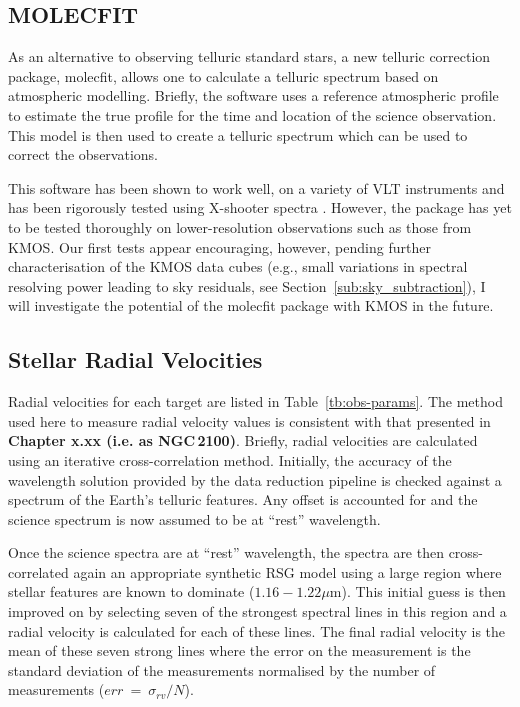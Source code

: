 
\subsection{MOLECFIT} %
\label{sub:molecfit}

As an alternative to observing telluric standard stars, a new telluric correction package, {\sc molecfit}, allows one to calculate a telluric spectrum based on atmospheric modelling.
Briefly, the software uses a reference atmospheric profile to estimate the true profile for the time and location of the science observation.
This model is then used to create a telluric spectrum which can be used to correct the observations.

This software has been shown to work well, on a variety of VLT instruments
\citep{2015A&A...576A..77S} and has been rigorously tested using X-shooter spectra
\citep{2015A&A...576A..78K}.
However, the package has yet to be tested thoroughly on lower-resolution observations such as those from KMOS.
Our first tests appear encouraging, however, pending further characterisation of the KMOS data cubes
(e.g., small variations in spectral resolving power leading to sky residuals,
see Section~\ref{sub:sky_subtraction}),
I will investigate the potential of the {\sc molecfit} package with KMOS in the future.


\subsection{Stellar Radial Velocities} %
\label{sub:RVs}


Radial velocities for each target are listed in Table~\ref{tb:obs-params}.
The method used here to measure radial velocity values is consistent with that presented in \textbf{Chapter x.xx (i.e. as NGC\,2100)}.
Briefly, radial velocities are calculated using an iterative cross-correlation method.
Initially, the accuracy of the wavelength solution provided by the data reduction pipeline is checked against a spectrum of the Earth's telluric features.
Any offset is accounted for and the science spectrum is now assumed to be at ``rest'' wavelength.

Once the science spectra are at ``rest'' wavelength, the spectra are then cross-correlated again an appropriate synthetic RSG model using a large region where stellar features are known to dominate ($1.16-1.22\mu$m).
This initial guess is then improved on by selecting seven of the strongest spectral lines in this region and a radial velocity is calculated for each of these lines.
The final radial velocity is the mean of these seven strong lines where the error on the measurement is the standard deviation of the measurements normalised by the number of measurements
($err$~=~$\sigma_{rv}/N$).


